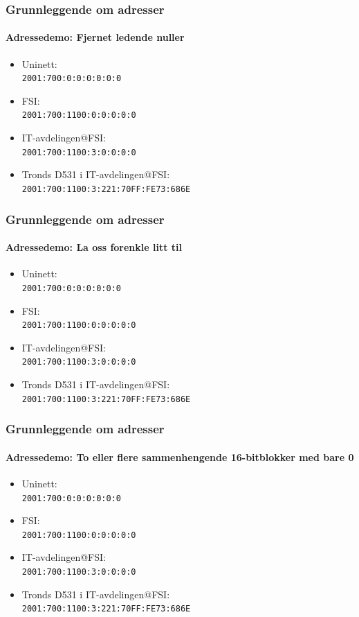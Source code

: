 \begin{frame}%
  \frametitle{Grunnleggende om adresser}
  \framesubtitle{Adressedemo: Fjernet ledende nuller}
  \begin{itemize}%
  \item Uninett:\\\texttt{2001:\alert{700}:\alert{0}:\alert{0}:\alert{0}:\alert{0}:\alert{0}:\alert{0}\phantom{/32}}
  \item FSI:\\\texttt{2001:\alert{700}:1100:\alert{0}:\alert{0}:\alert{0}:\alert{0}:\alert{0}\phantom{/48}}
  \item IT-avdelingen@FSI:\\\texttt{2001:\alert{700}:1100:\alert{3}:\alert{0}:\alert{0}:\alert{0}:\alert{0}\phantom{/64}}
  \item Tronds D531 i IT-avdelingen@FSI:\\\texttt{2001:\alert{700}:1100:\alert{3}:\alert{221}:70FF:FE73:686E\phantom{/128}}
  \end{itemize}
\end{frame}

\begin{frame}%
  \frametitle{Grunnleggende om adresser}
  \framesubtitle{Adressedemo: La oss forenkle litt til}
  \begin{itemize}%
  \item Uninett:\\\texttt{2001:700:0:0:0:0:0:0\phantom{/32}}
  \item FSI:\\\texttt{2001:700:1100:0:0:0:0:0\phantom{/48}}
  \item IT-avdelingen@FSI:\\\texttt{2001:700:1100:3:0:0:0:0\phantom{/64}}
  \item Tronds D531 i IT-avdelingen@FSI:\\\texttt{2001:700:1100:3:221:70FF:FE73:686E\phantom{/128}}
  \end{itemize}
\end{frame}

\begin{frame}%
  \frametitle{Grunnleggende om adresser}
  \framesubtitle{Adressedemo: To eller flere sammenhengende 16-bitblokker med bare 0}
  \begin{itemize}%
  \item Uninett:\\\texttt{2001:700:\alert{0:0:0:0:0:0}\phantom{/32}}
  \item FSI:\\\texttt{2001:700:1100:\alert{0:0:0:0:0}\phantom{/48}}
  \item IT-avdelingen@FSI:\\\texttt{2001:700:1100:3:\alert{0:0:0:0}\phantom{/64}}
  \item Tronds D531 i IT-avdelingen@FSI:\\\texttt{2001:700:1100:3:221:70FF:FE73:686E\phantom{/128}}
  \end{itemize}
\end{frame}

